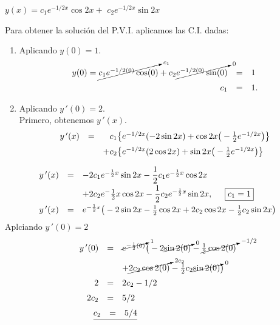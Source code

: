 \documentclass{beamer}
\begin{document}
\begin{frame}[t]
	\begin{alertblock}{}
		\begin{center}
			\(y(x) = c_1e^{-1/2x} \cos 2x +\) \color{red} \underline{\color{black} \(c_2e^{-1/2x} \sin 2x\)}
		\end{center}
		Para obtener la solución del P.V.I. aplicamos las C.I. dadas:
		\begin{enumerate}
			\item Aplicando \(y(0) = 1\).
				\[
					\begin{array}{rcl}
						y(0) = \cancelto{c_1}{c_1e^{-1/2(0)} \cos (0)} + c_2 \cancelto{0}{e^{-1/2(0)} \sin (0)} & = & 1 \\[2mm]
						c_1 & = & 1.
					\end{array}
				\]
			\item Aplicando \(y\,' (0) = 2\). \\[2mm]
				Primero, obtenemos \(y\,'(x)\).
				\[
					\begin{array}{rcl}
						y\,'(x) & = & \hphantom{+} c_1 \big\{e^{-1/2 x} (-2 \sin 2x) + \cos 2x \big(-\frac12 e^{-1/2x}\big)\big\} \\[2mm]
						&& +c_2 \big\{e^{-1/2x} (2 \cos 2x) + \sin 2x \big(- \frac12 e^{-1/2x}\big)\big\}
					\end{array}
				\]
		\end{enumerate}
	\end{alertblock}
\end{frame}

\begin{frame}[t]
	\begin{alertblock}{}
		\[
			\begin{array}{rcl}
				y\,' (x) & = & -2c_1e^{- \frac 12x} \sin 2x - \dfrac{1}{2} c_1 e^{- \frac 12x} \cos 2x \\[2mm]
				&& + 2c_2e^-{\frac 12x} \cos 2x - \dfrac{1}{2} c_2e^{- \frac 12x} \sin 2x , \hspace{5mm} \fbox{\(c_1=1\)} \\[2mm]
				y\,' (x) & = & e^{- \frac 12x} \big(-2 \sin 2x - \frac 12 \cos 2x + 2c_2 \cos 2x - \frac 12c_2 \sin 2x\big)
			\end{array}
		\]
		Aplciando \(y\,' (0) =2\)
		\[
			\begin{array}{rcl}
				y\,' (0) & = & \cancelto{1}{e^{- \frac 12(0)}}  \big(-2 \cancelto{0}{\sin 2(0)} - \cancelto{-1/2}{\frac 12 \cos 2(0)} \\[2mm]
				&& + \cancelto{2c_2}{2c_2 \cos 2(0)} - \frac 12c_2 \cancelto{0}{\sin 2(0)}\big) \\[2mm]
				2 & = & 2c_2-1/2 \\[2mm]
				2c_2 & = & 5/2 \\[2mm]
				\underline{\begin{matrix} c_2 & = & 5/4\end{matrix}} \hspace{-1.6cm}
			\end{array}
		\]
	\end{alertblock}
\end{frame}
\end{document}
